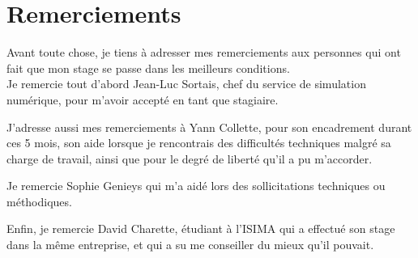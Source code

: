 \cleardoublepage



\chapter*{Remerciements}

\thispagestyle{empty}



Avant toute chose, je tiens à adresser mes remerciements aux personnes qui ont fait que mon stage se passe dans les meilleurs conditions.
\\


Je remercie tout d'abord Jean-Luc Sortais, chef du service de simulation numérique, pour m'avoir accepté en tant que stagiaire.

J'adresse aussi mes remerciements à Yann Collette, pour son encadrement durant ces 5 mois, son aide lorsque je rencontrais des difficultés techniques malgré sa charge de travail, ainsi que pour le degré de liberté qu'il a pu m'accorder.

Je remercie Sophie Genieys qui m'a aidé lors des sollicitations techniques ou méthodiques.

Enfin, je remercie David Charette, étudiant à l'ISIMA qui a effectué son stage dans la même entreprise, et qui a su me conseiller du mieux qu'il pouvait.